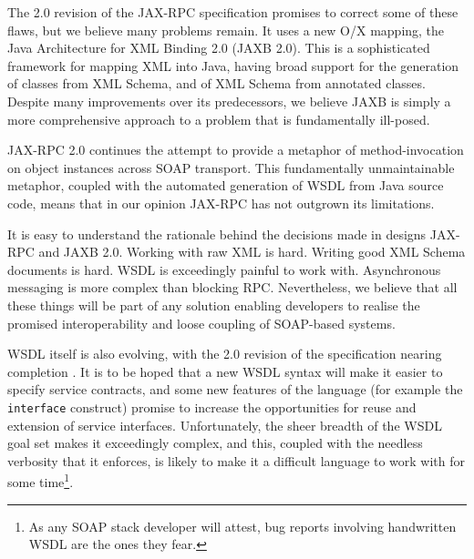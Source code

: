 The 2.0 revision of the JAX-RPC specification promises to correct some
of these flaws, but we believe many problems remain. It uses a new O/X
mapping, the Java Architecture for XML Binding 2.0 (JAXB
2.0)\cite{spec:JAX-B-20}. This is a sophisticated framework for
mapping XML into Java, having broad support for the generation of
classes from XML Schema, and of XML Schema from annotated classes. 
Despite many improvements over its predecessors, we believe JAXB is
simply a more comprehensive approach to a problem that is
fundamentally ill-posed.
  
JAX-RPC 2.0 continues the attempt to provide a metaphor of
method-invocation on object instances across SOAP transport. 
This fundamentally unmaintainable metaphor, coupled with the
automated generation of WSDL from Java source code, means that in our
opinion JAX-RPC has not outgrown its limitations. 

It is easy to understand the rationale behind the decisions made in
designs JAX-RPC and JAXB 2.0. Working with raw XML is hard. Writing
good XML Schema documents is hard. WSDL is exceedingly painful to work
with. Asynchronous messaging is more complex than blocking
RPC. Nevertheless, we believe that all these things will be part of
any solution enabling developers to realise the promised
interoperability and loose coupling of SOAP-based systems.

WSDL itself is also evolving, with the 2.0 revision of the
specification nearing completion \cite{spec:WSDL-20}. It is to be
hoped that a new WSDL syntax will make it easier to specify service
contracts, and some new features of the language (for example the {\tt
interface} construct) promise to increase the opportunities for reuse
and extension of service interfaces. Unfortunately, the sheer breadth
of the WSDL goal set makes it exceedingly complex, and this, coupled
with the needless verbosity that it enforces, is likely to make it a
difficult language to work with for some time\footnote{As any SOAP
stack developer will attest, bug reports involving handwritten WSDL
are the ones they fear.}.


